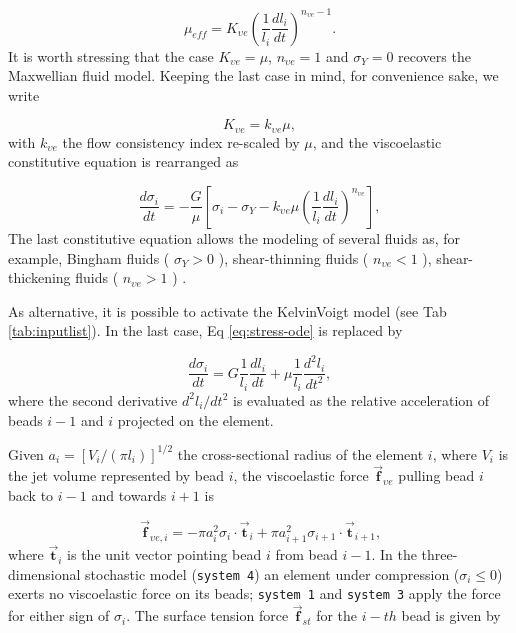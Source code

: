 \begin{equation}
\mu_{eff}=K_{\upsilon e}\left(\frac{1}{l_{i}}\frac{dl_{i}}{dt}\right)^{n_{\upsilon e}-1}.\label{eq:effective-viscosity}
\end{equation}
It is worth stressing that the case $K_{\upsilon e}=\mu$, $n_{\upsilon e}=1$
and $\sigma_{Y}=0$ recovers the Maxwellian fluid model. Keeping the
last case in mind, for convenience sake, we write

\begin{equation}
K_{\upsilon e}=k_{\upsilon e}\mu,\label{eq:rescaled-prefactor}
\end{equation}
with $k_{\upsilon e}$ the flow consistency index re-scaled by $\mu$,
and the viscoelastic constitutive equation is rearranged as

\begin{equation}
\frac{d\sigma_{i}}{dt}=-\frac{G}{\mu}\left[\sigma_{i}-\sigma_{Y}-k_{\upsilon e}\mu\left(\frac{1}{l_{i}}\frac{dl_{i}}{dt}\right)^{n_{\upsilon e}}\right],\label{eq:stress-ode}
\end{equation}
The last constitutive equation allows the modeling of several fluids
as, for example, Bingham fluids ( $\sigma_{Y}>0$ ), shear-thinning
fluids ( $n_{\upsilon e}<1$ ), shear-thickening fluids ( $n_{\upsilon e}>1$
) .

As alternative, it is possible to activate the Kelvin\textendash Voigt
model \cite{barnes1989introduction} (see Tab \ref{tab:inputlist}).
In the last case, Eq \ref{eq:stress-ode} is replaced by

\begin{equation}
\frac{d\sigma_{i}}{dt}=G\frac{1}{l_{i}}\frac{dl_{i}}{dt}+\mu\frac{1}{l_{i}}\frac{d^{2}l_{i}}{dt^{2}},\label{eq:stress-ode-KV}
\end{equation}
where the second derivative $d^{2}l_{i}/dt^{2}$ is evaluated as the
relative acceleration of beads $i-1$ and $i$ projected on the element.

Given $a_{i}=\left[V_{i}/\left(\pi l_{i}\right)\right]^{1/2}$ the
cross-sectional radius of the element $i$, where $V_{i}$ is the jet
volume represented by bead $i$, the viscoelastic force $\vec{\textbf{f}}_{\upsilon e}$ pulling
bead $i$ back to $i-1$ and towards $i+1$ is

\begin{equation}
\vec{\textbf{f}}_{\upsilon e,i}=-\pi a_{i}^{2}\sigma_{i}\cdot\vec{\textbf{t}}_{i}+\pi a_{i+1}^{2}\sigma_{i+1}\cdot\vec{\textbf{t}}_{i+1}\text{,}
\end{equation}
where $\vec{\textbf{t}}_{i}$ is the unit vector pointing bead $i$
from bead $i-1$. In the three-dimensional stochastic model (\texttt{system 4})
an element under compression ($\sigma_{i}\leq0$) exerts no viscoelastic
force on its beads; \texttt{system 1} and \texttt{system 3} apply the
force for either sign of $\sigma_{i}$. The surface tension force $\vec{\textbf{f}}_{st}$
for the $i-th$ bead is given by


